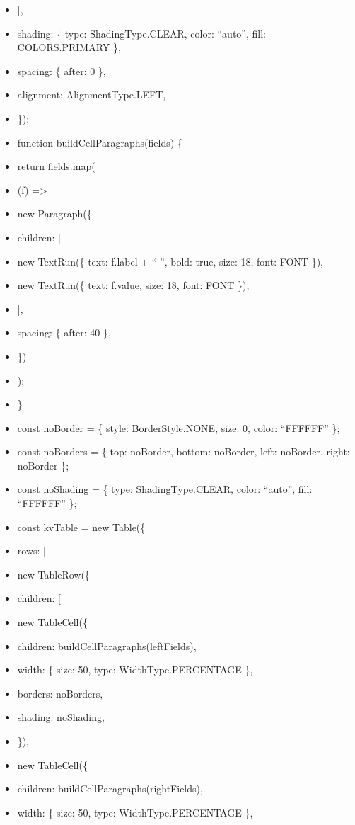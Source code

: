 \documentclass[11pt]{article}
\begin{document}
\begin{itemize}[leftmargin=*,itemsep=2pt,topsep=2pt]
\item {} ],
\item {} shading: \{ type: ShadingType.CLEAR, color: ``auto'', fill: COLORS.PRIMARY \},
\item {} spacing: \{ after: 0 \},
\item {} alignment: AlignmentType.LEFT,
\item {} \});
\item {} function buildCellParagraphs(fields) \{
\item {} return fields.map(
\item {} (f) =>
\item {} new Paragraph(\{
\item {} children: [
\item {} new TextRun(\{ text: f.label + `` '', bold: true, size: 18, font: FONT \}),
\item {} new TextRun(\{ text: f.value, size: 18, font: FONT \}),
\item {} ],
\item {} spacing: \{ after: 40 \},
\item {} \})
\item {} );
\item {} \}
\item {} const noBorder = \{ style: BorderStyle.NONE, size: 0, color: ``FFFFFF'' \};
\item {} const noBorders = \{ top: noBorder, bottom: noBorder, left: noBorder, right: noBorder \};
\item {} const noShading = \{ type: ShadingType.CLEAR, color: ``auto'', fill: ``FFFFFF'' \};
\item {} const kvTable = new Table(\{
\item {} rows: [
\item {} new TableRow(\{
\item {} children: [
\item {} new TableCell(\{
\item {} children: buildCellParagraphs(leftFields),
\item {} width: \{ size: 50, type: WidthType.PERCENTAGE \},
\item {} borders: noBorders,
\item {} shading: noShading,
\item {} \}),
\item {} new TableCell(\{
\item {} children: buildCellParagraphs(rightFields),
\item {} width: \{ size: 50, type: WidthType.PERCENTAGE \},

\end{itemize}
\end{document}
